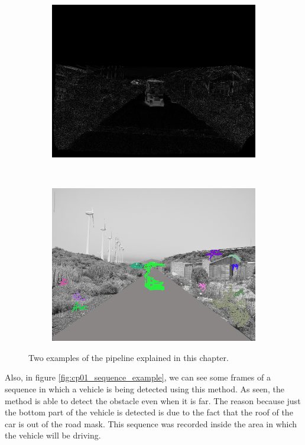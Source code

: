 \begin{figure}[h!]
\begin{subfigure}[b]{0.24\columnwidth}
	    \includegraphics[width=\textwidth]{pipeline2/fig4}\label{fig:pipelineB_3}
        \end{subfigure}%
        ~
        \begin{subfigure}[b]{0.24\columnwidth}
	    \includegraphics[width=\textwidth]{pipeline2/fig5}\label{fig:pipelineB_4}
        \end{subfigure}%
        \caption{Two examples of the pipeline explained in this chapter.}\label{fig:cp01_pipeline_example}
\end{figure}

Also, in figure \ref{fig:cp01_sequence_example}, we can see some frames of a sequence in which a vehicle is being detected using this method. As seen, the method is able to detect the obstacle even when it is far. The reason because just the bottom part of the vehicle is detected is due to the fact that the roof of the car is out of the road mask. This sequence was recorded inside the area in which the vehicle will be driving.

